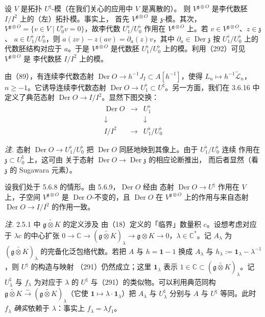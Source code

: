  设 $V$ 是拓扑 $U^{\natural}$-模（在我们关心的应用中 $V$ 是离散的）。
则 $V^{\mathfrak{g}\otimes O}$ 是李代数胚 $I/I^{2}$ 上的（左）拓扑模。事实上，
首先 $V^{\mathfrak{g}\otimes O}$ 是 $\mathfrak{z}$-模。其次，
$V^{\mathfrak{g}\otimes O}=\{v\in V\mid U^{\flat}_0v=0\}$，故李代数
$U^{\flat}_1/U^{\flat}_0$ 作用在 $V^{\mathfrak{g}\otimes O}$ 上。若
$v\in V^{\mathfrak{g}\otimes O}$、$z\in\mathfrak{z}$、
$a\in U^{\flat}_1/U^{\flat}_0$，则 $a(zv)-z(av)=\partial_a(z)v$，其中
$\partial_a\in\operatorname{Der}\mathfrak{z}$ 按 $U^{\flat}_1/U^{\flat}_0$ 上的
代数胚结构对应于 $a$。于是 $V^{\mathfrak{g}\otimes O}$ 是代数胚
$U^{\flat}_1/U^{\flat}_0$ 上的模。利用（292）可见 $V^{\mathfrak{g}\otimes O}$ 是
李代数胚 $I/I^{2}$ 上的模。

 由（89），有连续李代数态射
$\operatorname{Der}O\to h^{-1}J_I\subset A[h^{-1}]$，使得
$L_n\mapsto h^{-1}\widetilde{\mathcal{L}}_n$，$n\ge -1$。它诱导连续李代数态射
$\operatorname{Der}O\to U^{\flat}_1\subset U^{\natural}$。另一方面，我们在
3.6.16 中定义了典范态射 $\operatorname{Der}O\to I/I^{2}$。显然下图交换：
\[
\begin{array}{ccc}
\operatorname{Der}O & \longrightarrow & U^{\flat}_1\\[2pt]
\downarrow & & \downarrow\\[2pt]
I/I^{2} & \longrightarrow & U^{\flat}_1/U^{\flat}_0
\end{array}
\]

\emph{注.} 态射 $\operatorname{Der}O\to U^{\flat}_1/U^{\flat}_0$ 把
$\operatorname{Der}O$ 同胚地映到其像上。由于 $U^{\flat}_1/U^{\flat}_0$ 连续
作用在 $\mathfrak{z}\subset U^{\natural}_0$ 上，这可由
关于态射 $\operatorname{Der}O\to\operatorname{Der}\mathfrak{z}$ 的相应论断推出，
而后者显然（看 $\mathfrak{z}$ 的 Sugawara 元素）。

 设我们处于 5.6.8 的情形。由 5.6.9，$\operatorname{Der}O$ 经由
态射 $\operatorname{Der}O\to U^{\natural}$ 作用在 $V$ 上，子空间
$V^{\mathfrak{g}\otimes O}$ 是 $\operatorname{Der}O$-不变的，且
$\operatorname{Der}O$ 在 $V^{\mathfrak{g}\otimes O}$ 上的作用与来自态射
$\operatorname{Der}O\to I/I^{2}$ 的作用一致。

 \emph{注.} 2.5.1 中 $\widetilde{\mathfrak{g}\otimes K}$ 的定义涉及
由（18）定义的「临界」数量积 $c$。设想考虑对应于 $\lambda c$ 的中心扩张
$0\to\mathbb{C}\to(\widetilde{\mathfrak{g}\otimes K})_{\lambda}\to
\mathfrak{g}\otimes K\to 0$，$\lambda\in\mathbb{C}^{*}$。记 $A_{\lambda}$ 为
$(\widetilde{\mathfrak{g}\otimes K})_{\lambda}$ 的完备化泛包络代数。若把 $A$ 与
$h=\mathbf{1}-1$ 换成 $A_{\lambda}$ 与
$h_{\lambda}:=\mathbf{1}_{\lambda}-\lambda^{-1}$，则 $U^{\natural}$ 的构造与映射
（291）仍然成立；这里 $\mathbf{1}_{\lambda}$ 表示
$1\in\mathbb{C}\subset(\widetilde{\mathfrak{g}\otimes K})_{\lambda}$。记
$U^{\natural}_{\lambda}$ 与 $f_{\lambda}$ 为对应于 $\lambda$ 的
$U^{\natural}$ 与（291）的类似物。可以利用典范同构
$\widetilde{\mathfrak{g}\otimes K}\xrightarrow{\sim}
(\widetilde{\mathfrak{g}\otimes K})_{\lambda}$（它使
$\mathbf{1}\mapsto\lambda\cdot\mathbf{1}_{\lambda}$）把 $A_{\lambda}$ 与
$U^{\natural}_{\lambda}$ 分别与 $A$ 与 $U^{\natural}$ 等同。此时 $f_{\lambda}$
\emph{确实}依赖于 $\lambda$：事实上 $f_{\lambda}=\lambda f_1$。

